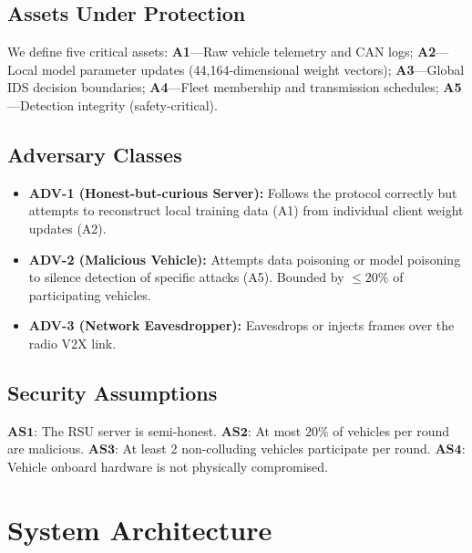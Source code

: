 \documentclass[conference]{IEEEtran}
\begin{document}
\subsection{Assets Under Protection}
We define five critical assets: \textbf{A1}---Raw vehicle telemetry and CAN logs;
\textbf{A2}---Local model parameter updates (44,164-dimensional weight vectors);
\textbf{A3}---Global IDS decision boundaries; \textbf{A4}---Fleet membership
and transmission schedules; \textbf{A5}---Detection integrity (safety-critical).

\subsection{Adversary Classes}
\begin{itemize}
  \item \textbf{ADV-1 (Honest-but-curious Server):} Follows the protocol
        correctly but attempts to reconstruct local training data (A1) from
        individual client weight updates (A2).
  \item \textbf{ADV-2 (Malicious Vehicle):} Attempts data poisoning or model
        poisoning to silence detection of specific attacks (A5). Bounded by
        $\le 20\%$ of participating vehicles.
  \item \textbf{ADV-3 (Network Eavesdropper):} Eavesdrops or injects frames
        over the radio V2X link.
\end{itemize}

\subsection{Security Assumptions}
$\mathbf{AS1}$: The RSU server is semi-honest.
$\mathbf{AS2}$: At most $20\%$ of vehicles per round are malicious.
$\mathbf{AS3}$: At least 2 non-colluding vehicles participate per round.
$\mathbf{AS4}$: Vehicle onboard hardware is not physically compromised.

\section{System Architecture}
\end{document}
